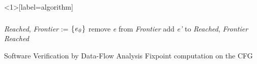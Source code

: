 
\begin{frame}<1>[label=algorithm]
  \frametitle{
    }
  \begin{algorithmic}
    \State \textit{Reached}, \textit{Frontier} := $\{\text{\textit{e}}_\text{\textit{0}}\}$
      \State remove \textit{e} from \textit{Frontier}
          \State add \textit{e'} to \textit{Reached}, \textit{Frontier}
        \EndIf
      \EndFor
    \EndWhile
  \State \Return \textit{Reached}
  \end{algorithmic}

\end{frame}


\begin{frame}{Software Verification by Data-Flow Analysis}
  \centering
  Fixpoint computation on the CFG

  \begin{minipage}[b]{0.5\textwidth}
    \resizebox{\textwidth}{!}{
      
    }
  \end{minipage}
\end{frame}






